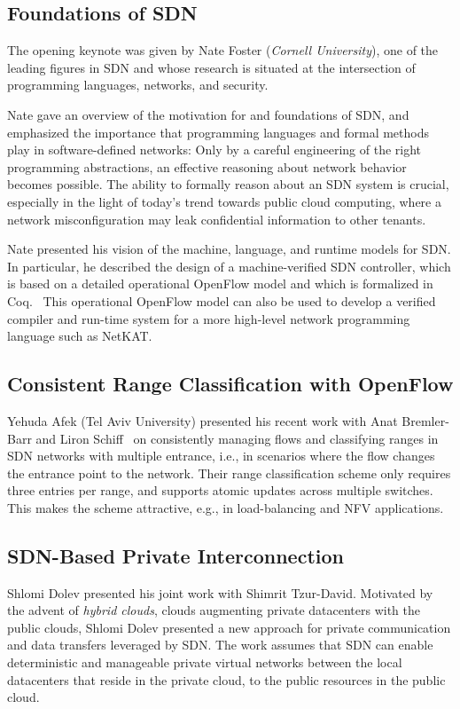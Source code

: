 \documentclass[11pt,pdftex,letter]{article}
\begin{document}
\subsection{Foundations of SDN}

The opening keynote was given by Nate Foster (\emph{Cornell University}),
one of the leading figures in SDN and whose research
is situated at the intersection of programming languages, networks, and security.

Nate gave an overview of the motivation for and foundations of SDN, and
emphasized the importance that programming languages and formal methods
play in software-defined networks: Only by a careful engineering of the right programming abstractions,
an effective reasoning about network behavior becomes possible. The ability to
formally reason about an SDN system is crucial, especially in the light
of today's trend towards public cloud computing, where a network misconfiguration may
leak confidential information to other tenants.

Nate presented his vision of the machine, language, and runtime models for SDN.
In particular, he described the design of a machine-verified SDN controller,
which is based on a detailed operational OpenFlow model
and which is formalized in Coq.~\cite{machine-verified}
This operational OpenFlow model can also be used
to develop a verified compiler and run-time system
for a more high-level network programming language such as NetKAT.~\cite{netkat}


\subsection{Consistent Range Classification with OpenFlow}

Yehuda Afek (Tel Aviv University) presented his recent work with Anat Bremler-Barr and
Liron Schiff~\cite{AfekBS14} on consistently managing flows and classifying ranges
in SDN networks with multiple entrance, i.e., in scenarios where the flow changes the entrance point
to the network.
Their range classification scheme only requires three entries per range,
and supports atomic updates across multiple switches. This makes the scheme attractive,
e.g., in load-balancing and NFV applications.


\subsection{SDN-Based Private Interconnection}

Shlomi Dolev presented his joint work with Shimrit Tzur-David.
Motivated by the advent of \emph{hybrid clouds}, clouds augmenting
private datacenters with the public clouds, Shlomi Dolev
presented a new approach for private communication and data transfers
leveraged by SDN. The work assumes that SDN can enable deterministic and manageable private virtual
networks between the local datacenters that reside in the private cloud, to the public resources in the public cloud.
\end{document}
